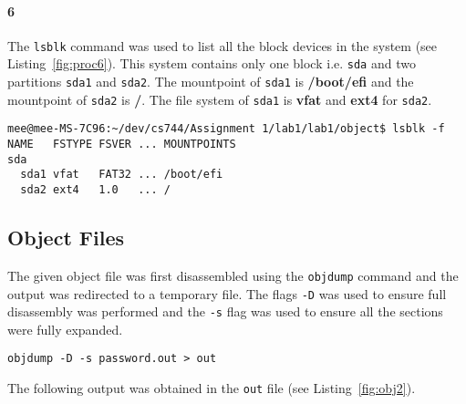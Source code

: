 \documentclass[final,5p,times,authoryear]{elsarticle}
\begin{document}
\paragraph{\bf 6}
The {\tt lsblk} command was used to list all the block devices in the system (see Listing~\ref{fig:proc6}).
This system contains only one block i.e. {\tt sda} and two partitions {\tt sda1} and {\tt sda2}. 
The mountpoint of {\tt sda1} is {\bf /boot/efi} and the mountpoint of {\tt sda2} is {\bf /}.
The file system of {\tt sda1} is {\bf vfat} and {\bf ext4} for {\tt sda2}.

\begin{lstlisting}[captionpos=b, caption={Snippet showing list of open files for {\tt openfiles}.},label={fig:proc6},style=codeBash]
mee@mee-MS-7C96:~/dev/cs744/Assignment 1/lab1/lab1/object$ lsblk -f
NAME   FSTYPE FSVER ... MOUNTPOINTS
sda                                                                           
  sda1 vfat   FAT32 ... /boot/efi
  sda2 ext4   1.0   ... /
\end{lstlisting}

\pagebreak

\subsection{Object Files}

The given object file was first disassembled using the {\tt objdump} command and the output was redirected to a temporary file.
The flags {\tt -D} was used to ensure full disassembly was performed and the {\tt -s} flag was used to ensure all the sections were fully expanded.

\begin{lstlisting}[captionpos=b, caption={Snippet showing the command used to dump the given object file.},label={fig:obj1},style=codeBash]
objdump -D -s password.out > out
\end{lstlisting}

The following output was obtained in the {\tt out} file (see Listing~\ref{fig:obj2}).
\end{document}

